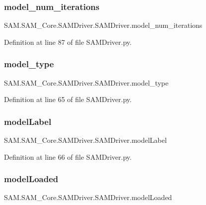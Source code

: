 \subsubsection{\texorpdfstring{model\+\_\+num\+\_\+iterations}{model\_num\_iterations}}
{\footnotesize\ttfamily S\+A\+M.\+S\+A\+M\+\_\+\+Core.\+S\+A\+M\+Driver.\+S\+A\+M\+Driver.\+model\+\_\+num\+\_\+iterations}



Definition at line 87 of file S\+A\+M\+Driver.\+py.

\mbox{\label{group__icubclient__SAM__Drivers_ga825f509582eecf9d63d742b9f47cf759}} 
\subsubsection{\texorpdfstring{model\+\_\+type}{model\_type}}
{\footnotesize\ttfamily S\+A\+M.\+S\+A\+M\+\_\+\+Core.\+S\+A\+M\+Driver.\+S\+A\+M\+Driver.\+model\+\_\+type}



Definition at line 65 of file S\+A\+M\+Driver.\+py.

\mbox{\label{group__icubclient__SAM__Drivers_ga25e341fd0f6a6103844e8412ee7811a4}} 
\subsubsection{\texorpdfstring{model\+Label}{modelLabel}}
{\footnotesize\ttfamily S\+A\+M.\+S\+A\+M\+\_\+\+Core.\+S\+A\+M\+Driver.\+S\+A\+M\+Driver.\+model\+Label}



Definition at line 66 of file S\+A\+M\+Driver.\+py.

\mbox{\label{group__icubclient__SAM__Drivers_ga820552da530ea75cc7109c7e450b7e31}} 
\subsubsection{\texorpdfstring{model\+Loaded}{modelLoaded}}
{\footnotesize\ttfamily S\+A\+M.\+S\+A\+M\+\_\+\+Core.\+S\+A\+M\+Driver.\+S\+A\+M\+Driver.\+model\+Loaded}



